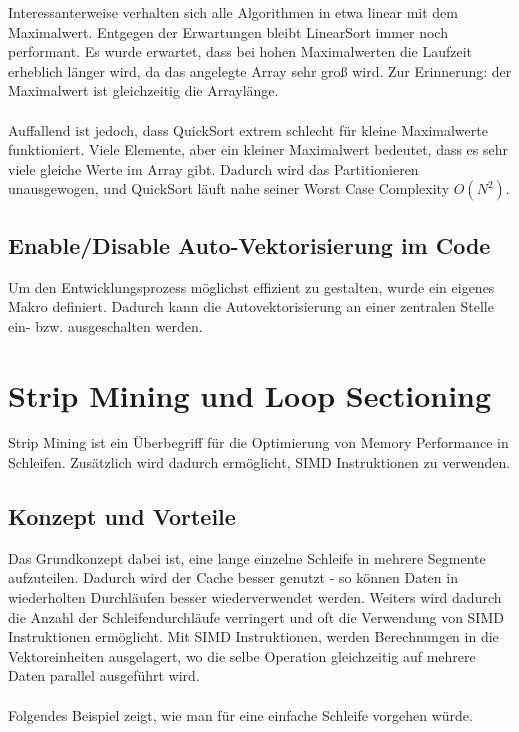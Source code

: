 Interessanterweise verhalten sich alle Algorithmen in etwa linear mit dem Maximalwert. Entgegen der Erwartungen bleibt LinearSort immer noch performant. Es wurde erwartet, dass bei hohen Maximalwerten die Laufzeit erheblich länger wird, da das angelegte Array sehr groß wird. Zur Erinnerung: der Maximalwert ist gleichzeitig die Arraylänge.\\
\\
Auffallend ist jedoch, dass QuickSort extrem schlecht für kleine Maximalwerte funktioniert. Viele Elemente, aber ein kleiner Maximalwert bedeutet, dass es sehr viele gleiche Werte im Array gibt. Dadurch wird das Partitionieren unausgewogen, und QuickSort läuft nahe seiner Worst Case Complexity $O(N^2)$.

\newpage
\subsection{Enable/Disable Auto-Vektorisierung im Code}

Um den Entwicklungsprozess möglichst effizient zu gestalten, wurde ein eigenes Makro definiert. Dadurch kann die Autovektorisierung an einer zentralen Stelle ein- bzw. ausgeschalten werden.\\



\section{Strip Mining und Loop Sectioning}

Strip Mining ist ein Überbegriff für die Optimierung von Memory Performance in Schleifen. Zusätzlich wird dadurch ermöglicht, SIMD Instruktionen zu verwenden.

\subsection{Konzept und Vorteile}

Das Grundkonzept dabei ist, eine lange einzelne Schleife in mehrere Segmente aufzuteilen. Dadurch wird der Cache besser genutzt - so können Daten in wiederholten Durchläufen besser wiederverwendet werden. Weiters wird dadurch die Anzahl der Schleifendurchläufe verringert und oft die Verwendung von SIMD Instruktionen ermöglicht. Mit SIMD Instruktionen, werden Berechnungen in die Vektoreinheiten ausgelagert, wo die selbe Operation gleichzeitig auf mehrere Daten parallel ausgeführt wird.\\
\\
Folgendes Beispiel zeigt, wie man für eine einfache Schleife vorgehen würde.\\

